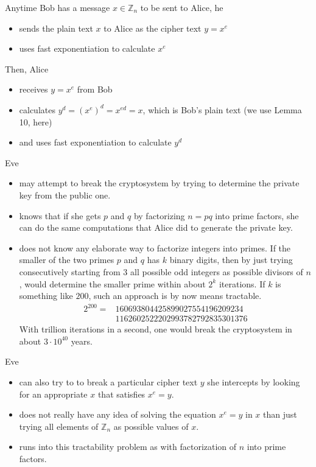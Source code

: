 \documentclass{beamer}
\newcommand{\Z}{\mathbb{Z}}
\begin{document}
\begin{frame}
	\pause 
Anytime Bob has a message $x \in \Z_n$ to be sent to Alice, he 
\begin{itemize}[<+->] 
	\item sends the plain text $x$ to Alice as the cipher text $y = x^e$
	\item uses fast exponentiation to calculate $x^e$
\end{itemize} 
\pause 
Then, Alice 
\begin{itemize}[<+->]
	\item receives $y = x^e$ from Bob
	\item calculates $y^d = (x^e)^d = x^{ed} = x$, which is Bob's plain text (we use Lemma 10, here)
	\item and uses fast exponentiation to calculate $y^d$
\end{itemize} 
\pause 
\end{frame} 
\begin{frame} 
Eve
\begin{itemize}[<+->]
	\item may attempt to break the cryptosystem by trying to determine the private key from the public one. 
	\item knows that if she gets $p$ and $q$ by factorizing $n = pq$ into prime factors, she can do the same computations that Alice did to generate the private key. 
	\item does not know any elaborate way to factorize integers into primes. If the smaller of the two primes $p$ and $q$ has $k$ binary digits, then by just trying consecutively starting from $3$ all possible odd integers as possible divisors of $n$, would determine the smaller prime within about $2^k$ iterations. If $k$ is something like $200$, such an approach is by now means tractable. 
	\begin{align*} 
	2^{200} = & 160693804425899027554196209234
		\\ & 1162602522202993782792835301376
	\end{align*} 
	With trillion iterations in a second,  one would break the cryptosystem in about $3 \cdot 10^{40}$ years. 
\end{itemize} 
\end{frame} 

\begin{frame} 
	Eve 
\begin{itemize}[<+->]
	\item can also try to to break a particular cipher text  $y$ she intercepts by looking for an appropriate $x$ that satisfies $x^e = y$. 
	\item does not really have any idea of solving the equation $x^e = y$ in $x$ than just trying all elements of $\Z_n$ as possible values of $x$.  
	\item runs into this tractability problem as with factorization of $n$ into prime factors. 
\end{itemize} 
\end{frame} 
\end{document}
